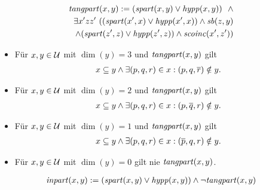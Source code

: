 
\begin{erin}
    \begin{align*}
        \mathit{tangpart}(x,y) := (\mathit{spart}(x,y) \vee \mathit{hypp}(x,y))\ \ \wedge\\
        \exists x'zz'\ ((\mathit{spart}(x',x) \vee \mathit{hypp}(x',x)) \wedge 
        \mathit{sb}(z,y) \\
        \wedge (\mathit{spart}(z',z) \vee \mathit{hypp}(z',z)) \wedge \mathit{scoinc}(x',z'))
    \end{align*}
\end{erin}

\begin{hyp}\label{satz:tangpart}
    \begin{itemize}\ 
        \item Für $x,y \in \mathcal{U}$ mit $\dim(y) = 3$ und $\mathit{tangpart}(x,y)$ gilt
            \begin{align*}
                x \subseteq y \land \exists (p,q,r) \in x : (p,q,\overline{r}) \notin y.
            \end{align*}
        \item Für $x,y \in \mathcal{U}$ mit $\dim(y) = 2$ und $\mathit{tangpart}(x,y)$ gilt
            \begin{align*}
                x \subseteq y \land \exists (p,q,r) \in x : (p,\overline{q},r) \notin y.
            \end{align*}
        \item Für $x,y \in \mathcal{U}$ mit $\dim(y) = 1$ und $\mathit{tangpart}(x,y)$ gilt
            \begin{align*}
                x \subseteq y \land \exists (p,q,r) \in x : (\overline{p},q,r) \notin y.
            \end{align*}
        \item Für $x,y \in \mathcal{U}$ mit $\dim(y) = 0$ gilt nie $\mathit{tangpart}(x,y)$.
    \end{itemize}
\end{hyp}



\begin{erin}
    \begin{align*}
        \mathit{inpart}(x, y) := (\mathit{spart}(x,y) \vee \mathit{hypp}(x,y)) \land \neg \mathit{tangpart}(x, y)
    \end{align*}
\end{erin}

